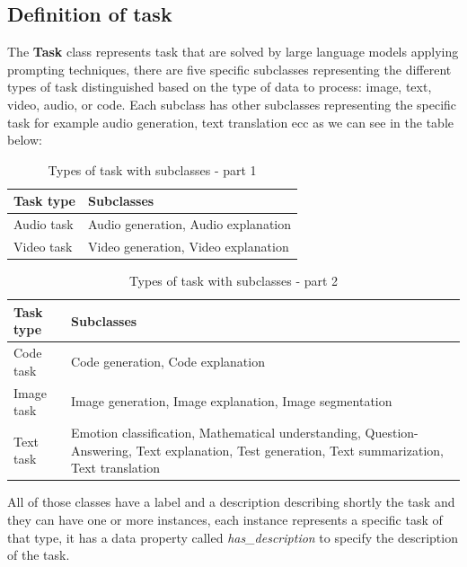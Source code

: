 \subsection{Definition of task}
The \textbf{Task} class represents task that are solved by large language models applying prompting techniques, there are five specific subclasses representing the different types of task distinguished based on the type of data to process: image, text, video, audio, or code. Each subclass has other subclasses representing the specific task for example audio generation, text translation ecc as we can see in the table below:
\begin{table}[H]
    \centering
    \begin{tabular}{|>{\raggedright\arraybackslash}p{6cm}|>{\raggedright\arraybackslash}p{6cm}|}
        \hline
        \textbf{Task type} & \textbf{Subclasses} \\ \hline
        Audio task & Audio generation, Audio explanation \\ \hline

        Video task & Video generation, Video explanation \\ \hline
    \end{tabular}
    \caption{Types of task with subclasses - part 1}
\end{table}

\begin{table}[H]
    \centering
    \begin{tabular}{|>{\raggedright\arraybackslash}p{6cm}|>{\raggedright\arraybackslash}p{6cm}|}
        \hline
        \textbf{Task type} & \textbf{Subclasses} \\ \hline
        Code task & Code generation, Code explanation \\ \hline

        Image task & Image generation, Image explanation, Image segmentation \\ \hline

        Text task & Emotion classification, Mathematical understanding, Question-Answering, Text explanation, Test generation, Text summarization, Text translation \\ \hline
    \end{tabular}
    \caption{Types of task with subclasses - part 2}
\end{table}
All of those classes have a label and a description describing shortly the task and they can have one or more instances, each instance represents a specific task of that type, it has a data property called \textit{has\_description} to specify the description of the task.

